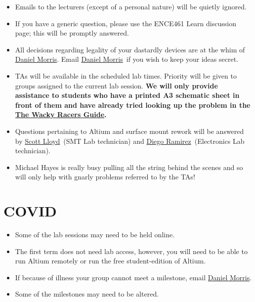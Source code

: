 \documentclass[11pt, a4paper]{article}
\makeatletter
\newcommand{\daniel}{\href{mailto:daniel.morris@pg.canterbury.ac.nz}{Daniel Morris}}
\newcommand{\scott}{\href{mailto:scott.lloyd@.canterbury.ac.nz}{Scott Lloyd}}
\newcommand{\diego}{\href{mailto:diego.ramirez@canterbury.ac.nz}{Diego Ramirez}}
\newcommand{\theguide}{\href{https://eng-git.canterbury.ac.nz/wacky-racers/wacky-racers/-/blob/master/doc/guide/guide.pdf}{The Wacky Racers Guide}}
\makeatother
\begin{document}
\begin{itemize}
\item Emails to the lecturers (except of a personal nature) will be
  quietly ignored.

\item If you have a generic question, please use the ENCE461 Learn
  discussion page; this will be promptly answered.

\item All decisions regarding legality of your dastardly devices are
  at the whim of \daniel.  Email \daniel\ if you wish to keep your
    ideas secret.

\item TAs will be available in the scheduled lab times.  Priority will
  be given to groups assigned to the current lab session. \textbf{We
    will only provide assistance to students who have a printed A3
    schematic sheet in front of them and have already tried looking up
    the problem in the \theguide.}

\item Questions pertaining to Altium and surface mount rework will be
  answered by \scott\ (SMT Lab technician) and \diego\ (Electronics
  Lab technician).

\item Michael Hayes is really busy pulling all the string behind the
  scenes and so will only help with gnarly problems referred to by the
  TAs!

\end{itemize}


\section{COVID}


\begin{itemize}
\item Some of the lab sessions may need to be held online.

\item The first term does not need lab access, however, you will need
  to be able to run Altium remotely or run the free student-edition of
  Altium.

\item If because of illness your group cannot meet a milestone, email
  \daniel.

\item Some of the milestones may need to be altered.

\end{itemize}
\end{document}
